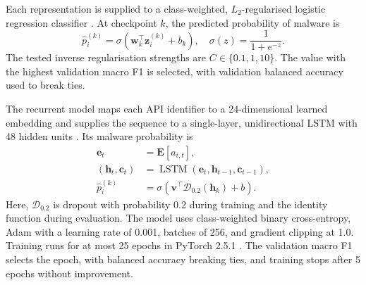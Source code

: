 \documentclass[10pt,twocolumn]{article}
\begin{document}
Each representation is supplied to a class-weighted, $L_2$-regularised logistic regression classifier \cite{pedregosa2011}. At checkpoint $k$, the predicted probability of malware is
\begin{equation}
 \hat p_i^{(k)}=\sigma\!\left(\mathbf{w}_k^\top\mathbf{z}_i^{(k)}+b_k\right),
 \quad \sigma(z)=\frac{1}{1+e^{-z}}.
 \label{eq:logistic}
\end{equation}
The tested inverse regularisation strengths are $C\in\{0.1,1,10\}$. The value with the highest validation macro F1 is selected, with validation balanced accuracy used to break ties.

The recurrent model maps each API identifier to a 24-dimensional learned embedding and supplies the sequence to a single-layer, unidirectional LSTM with 48 hidden units \cite{hochreiter1997}. Its malware probability is
\begin{equation}
 \begin{aligned}
  \mathbf{e}_t&=\mathbf{E}[a_{i,t}],\\
  (\mathbf{h}_t,\mathbf{c}_t)&=\operatorname{LSTM}(\mathbf{e}_t,\mathbf{h}_{t-1},\mathbf{c}_{t-1}),\\
  \hat p_i^{(k)}&=\sigma\!\left(\mathbf{v}^{\top}
  \mathcal{D}_{0.2}(\mathbf{h}_k)+b\right).
 \end{aligned}
 \label{eq:lstm}
\end{equation}
Here, $\mathcal{D}_{0.2}$ is dropout with probability 0.2 during training and the identity function during evaluation. The model uses class-weighted binary cross-entropy, Adam with a learning rate of 0.001, batches of 256, and gradient clipping at 1.0. Training runs for at most 25 epochs in PyTorch 2.5.1 \cite{paszke2019}. The validation macro F1 selects the epoch, with balanced accuracy breaking ties, and training stops after 5 epochs without improvement.
\end{document}

